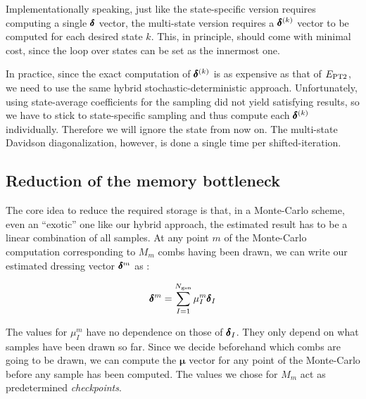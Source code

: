 \documentclass[./thesis.tex]{subfiles}
\begin{document}
Implementationally speaking, just like the state-specific version requires computing a single $\pmb \delta$ vector, the multi-state version requires a $\pmb \delta^{(k)}$ vector to be computed for each desired state $k$. This, in principle, should come with minimal cost, since the loop over states can be set as the innermost one. 

In practice, since the exact computation of $\pmb \delta^{(k)}$ is as expensive as that of $E_\text{PT2}$, we need to use the same hybrid stochastic-deterministic approach. Unfortunately, using state-average coefficients for the sampling did not yield satisfying results, so we have to stick to state-specific sampling and thus compute each $\pmb \delta^{(k)}$ individually. Therefore we will ignore the state from now on.
The multi-state Davidson diagonalization, however, is done a single time per shifted-\Bk iteration.

\subsection{Reduction of the memory bottleneck}

The core idea to reduce the required storage is that, in a Monte-Carlo scheme, even an ``exotic'' one like our hybrid approach, the estimated result has to be a linear combination of all samples. At any point $m$ of the Monte-Carlo computation corresponding to $M_m$ combs having been drawn, we can write our estimated dressing vector $\pmb \delta^m$ as :


\begin{equation}
\pmb \delta^m = \sum_{I=1}^{{N_\text{gen}}} \mu^m_{I} \pmb \delta_I
\end{equation}


The values for $\mu^m_I$ have no dependence on those of $\pmb \delta_I$. They only depend on what samples have been drawn so far. Since we decide beforehand which combs are going to be drawn, we can compute the ${\pmb \mu}$ vector for any point of the Monte-Carlo before any sample has been computed. The values we chose for $M_m$ act as predetermined \emph{checkpoints}.

\end{document}
